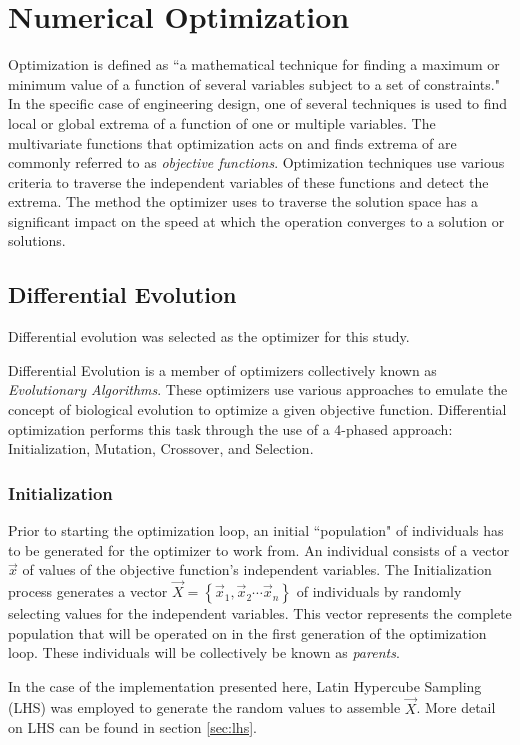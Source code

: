 \section{Numerical Optimization}
Optimization is defined as ``a mathematical technique for finding a maximum or minimum value of a function of several variables subject to a set of constraints."\cite{opt-def} In the specific case of engineering design, one of several techniques is used to find local or global extrema of a function of one or multiple variables. The multivariate functions that optimization acts on and finds extrema of are commonly referred to as \emph{objective functions}. Optimization techniques use various criteria to traverse the independent variables of these functions and detect the extrema. The method the optimizer uses to traverse the solution space has a significant impact on the speed at which the operation converges to a solution or solutions.\cite{basic-optim} 

\subsection{Differential Evolution}
Differential evolution was selected as the optimizer for this study. 

Differential Evolution is a member of optimizers collectively known as \emph{Evolutionary Algorithms}. These optimizers use various approaches to emulate the concept of biological evolution to optimize a given objective function. Differential optimization performs this task through the use of a 4-phased approach: Initialization, Mutation, Crossover, and Selection. \cite{diff-evol}

\subsubsection{Initialization}
Prior to starting the optimization loop, an initial ``population" of individuals has to be generated for the optimizer to work from. An individual consists of a vector $\vec{x}$ of values of the objective function's independent variables. The Initialization process generates a vector $\vec{X} = \left\{\vec{x}_1, \vec{x}_2 \cdots \vec{x}_n\right\}$ of individuals by randomly selecting values for the independent variables. This vector represents the complete population that will be operated on in the first generation of the optimization loop. These individuals will be collectively be known as \emph{parents}.\cite{diff-evol} 

In the case of the implementation presented here, Latin Hypercube Sampling (LHS) was employed to generate the random values to assemble $\vec{X}$. More detail on LHS can be found in section \ref{sec:lhs}. 

